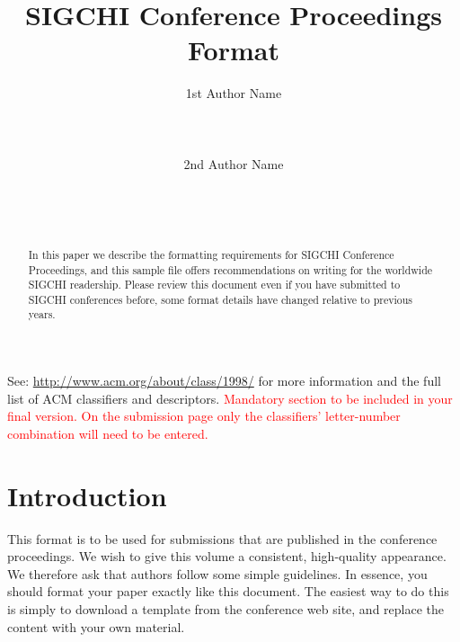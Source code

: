 \documentclass{sigchi}
\begin{document}
\title{SIGCHI Conference Proceedings Format}

\author{
  \alignauthor 1st Author Name\\
    \\
    \\
    \\
  \alignauthor 2nd Author Name\\
    \\
    \\
    \\
}

\maketitle

\begin{abstract}
In this paper we describe the formatting requirements for
SIGCHI Conference Proceedings, and this sample file
offers recommendations on writing for the worldwide
SIGCHI readership. Please review this document even if
you have submitted to SIGCHI conferences before, some
format details have changed relative to previous years.
\end{abstract}



See: \url{http://www.acm.org/about/class/1998/}
for more information and the full list of ACM classifiers
and descriptors. 
\textcolor{red}{Mandatory section to be included in your
final version. On the submission page only the classifiers'
letter-number combination will need to be entered.}

\section{Introduction}

This format is to be used for submissions that are
published in the conference proceedings.  We wish to give
this volume a consistent, high-quality appearance. We
therefore ask that authors follow some simple
guidelines. In essence, you should format your paper
exactly like this document. The easiest way to do this is
simply to download a template from the conference web
site, and replace the content with your own material.
\end{document}
